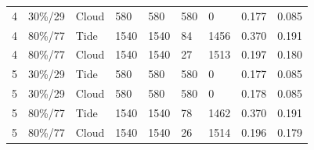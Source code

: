 \begin{table}[!htbp]
{\begin{tabular}{lllllllll}
4 & 30\%/29 & Cloud & 580 & 580 & 580 & 0 & 0.177 & 0.085 \\
4 & 80\%/77 & Tide & 1540 & 1540 & 84 & 1456 & 0.370 & 0.191 \\
4 & 80\%/77 & Cloud & 1540 & 1540 & 27 & 1513 & 0.197 & 0.180 \\
5 & 30\%/29 & Tide & 580 & 580 & 580 & 0 & 0.177 & 0.085 \\
5 & 30\%/29 & Cloud & 580 & 580 & 580 & 0 & 0.178 & 0.085 \\
5 & 80\%/77 & Tide & 1540 & 1540 & 78 & 1462 & 0.370 & 0.191 \\
5 & 80\%/77 & Cloud & 1540 & 1540 & 26 & 1514 & 0.196 & 0.179 \\
\bottomrule
\end{tabular}}
\end{table}

